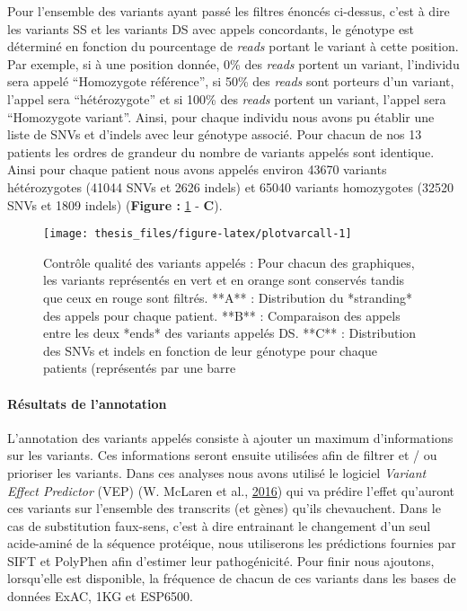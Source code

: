\documentclass[12pt,twoside]{reedthesis}
\theoremstyle{definition}
\theoremstyle{definition}
\theoremstyle{remark}
\begin{document}
  Pour l'ensemble des variants ayant passé les filtres énoncés ci-dessus,
  c'est à dire les variants SS et les variants DS avec appels concordants,
  le génotype est déterminé en fonction du pourcentage de \emph{reads}
  portant le variant à cette position. Par exemple, si à une position
  donnée, 0\% des \emph{reads} portent un variant, l'individu sera appelé
  ``Homozygote référence'', si 50\% des \emph{reads} sont porteurs d'un
  variant, l'appel sera ``hétérozygote'' et si 100\% des \emph{reads}
  portent un variant, l'appel sera ``Homozygote variant''. Ainsi, pour
  chaque individu nous avons pu établir une liste de SNVs et d'indels avec
  leur génotype associé. Pour chacun de nos 13 patients les ordres de
  grandeur du nombre de variants appelés sont identique. Ainsi pour chaque
  patient nous avons appelés environ 43670 variants hétérozygotes (41044
  SNVs et 2626 indels) et 65040 variants homozygotes (32520 SNVs et 1809
  indels) (\textbf{Figure : }\ref{fig:plotvarcall} - \textbf{C}).
  
  \newpage
  
  \begin{figure}
  
  {\centering \texttt{[image: thesis\_files/figure-latex/plotvarcall-1]} 
  
  }
  
  \caption[Contrôle qualité des variants appelés]{Contrôle qualité des variants appelés : Pour chacun des graphiques, les variants représentés en vert et en orange sont conservés tandis que ceux en rouge sont filtrés. **A** : Distribution du *stranding* des appels pour chaque patient. **B** : Comparaison des appels entre les deux *ends* des variants appelés DS. **C** : Distribution des SNVs et indels en fonction de leur génotype pour chaque patients (représentés par une barre}\label{fig:plotvarcall}
  \end{figure}
  
  \newpage
  
  \paragraph{Résultats de l'annotation}\label{resultats-de-lannotation}
  
  L'annotation des variants appelés consiste à ajouter un maximum
  d'informations sur les variants. Ces informations seront ensuite
  utilisées afin de filtrer et / ou prioriser les variants. Dans ces
  analyses nous avons utilisé le logiciel \emph{Variant Effect Predictor}
  (VEP) (W. McLaren et al., \protect\hyperlink{ref-McLaren2016}{2016}) qui
  va prédire l'effet qu'auront ces variants sur l'ensemble des transcrits
  (et gènes) qu'ils chevauchent. Dans le cas de substitution faux-sens,
  c'est à dire entrainant le changement d'un seul acide-aminé de la
  séquence protéique, nous utiliserons les prédictions fournies par SIFT
  et PolyPhen afin d'estimer leur pathogénicité. Pour finir nous ajoutons,
  lorsqu'elle est disponible, la fréquence de chacun de ces variants dans
  les bases de données ExAC, 1KG et ESP6500.
  
\end{document}
